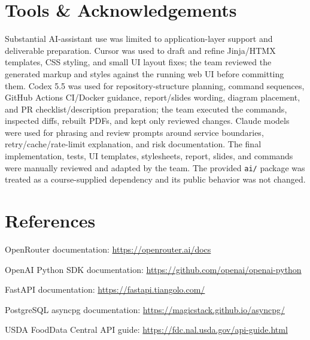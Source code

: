\documentclass[11pt,a4paper]{article}
\begin{document}
\section{Tools \& Acknowledgements}\label{sec:tools}

\begin{responsebox}
Substantial AI-assistant use was limited to application-layer support and deliverable preparation. Cursor was used to draft and refine Jinja/HTMX templates, CSS styling, and small UI layout fixes; the team reviewed the generated markup and styles against the running web UI before committing them. Codex 5.5 was used for repository-structure planning, command sequences, GitHub Actions CI/Docker guidance, report/slides wording, diagram placement, and PR checklist/description preparation; the team executed the commands, inspected diffs, rebuilt PDFs, and kept only reviewed changes. Claude models were used for phrasing and review prompts around service boundaries, retry/cache/rate-limit explanation, and risk documentation. The final implementation, tests, UI templates, stylesheets, report, slides, and commands were manually reviewed and adapted by the team. The provided \texttt{ai/} package was treated as a course-supplied dependency and its public behavior was not changed.
\end{responsebox}

\section*{References}

\begin{enumerate}[label={[\arabic*]},leftmargin=2.4em,itemsep=2pt]
  \item OpenRouter documentation: \url{https://openrouter.ai/docs}
  \item OpenAI Python SDK documentation: \url{https://github.com/openai/openai-python}
  \item FastAPI documentation: \url{https://fastapi.tiangolo.com/}
  \item PostgreSQL asyncpg documentation: \url{https://magicstack.github.io/asyncpg/}
  \item USDA FoodData Central API guide: \url{https://fdc.nal.usda.gov/api-guide.html}
\end{enumerate}
\end{document}
